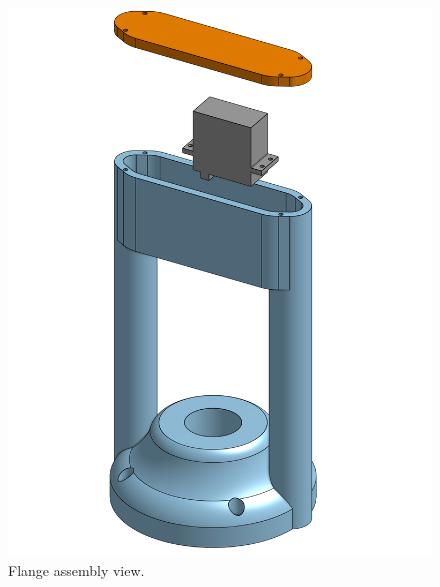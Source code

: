\begin{figure}[htbp]
  \centering
  \includegraphics[width=0.4\linewidth]{"Flange_Assembly.png"}
  \caption{Flange assembly view.}
  \label{fig:flange}
\end{figure}